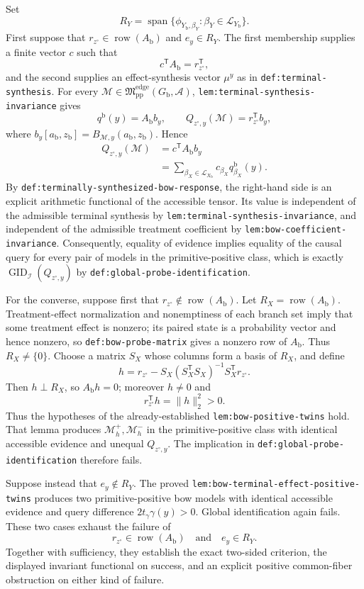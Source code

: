 Set
\[
 R_Y=\operatorname{span}\{\phi_{Y_{\mathrm b},\beta_Y}:\beta_Y\in\mathcal L_{Y_{\mathrm b}}\}.
\]
First suppose that \(r_{z^{\circ}}\in\operatorname{row}(A_{\mathrm b})\) and \(e_y\in R_Y\).  The first membership supplies a finite vector \(c\) such that
\[
 c^{\mathsf T}A_{\mathrm b}=r_{z^{\circ}}^{\mathsf T},
\]
and the second supplies an effect-synthesis vector \(\mu^y\) as in \texttt{def:terminal-synthesis}.  For every \(\mathcal M\in\mathfrak M_{\mathrm{pp}}^{\mathrm{edge}}(G_{\mathrm b},\mathcal A)\), \texttt{lem:terminal-synthesis-invariance} gives
\[
 q^{\mathrm b}(y)=A_{\mathrm b}b_y,
 \qquad
 Q_{z^{\circ},y}(\mathcal M)=r_{z^{\circ}}^{\mathsf T}b_y,
\]
where \(b_y[a_{\mathrm b},z_{\mathrm b}]=B_{\mathcal M,y}(a_{\mathrm b},z_{\mathrm b})\).  Hence
\[
\begin{aligned}
 Q_{z^{\circ},y}(\mathcal M)
 &=c^{\mathsf T}A_{\mathrm b}b_y\\
 &=\sum_{\beta_X\in\mathcal L_{X_{\mathrm b}}}
 c_{\beta_X}q^{\mathrm b}_{\beta_X}(y).
\end{aligned}
\]
By \texttt{def:terminally-synthesized-bow-response}, the right-hand side is an explicit arithmetic functional of the accessible tensor.  Its value is independent of the admissible terminal synthesis by \texttt{lem:terminal-synthesis-invariance}, and independent of the admissible treatment coefficient by \texttt{lem:bow-coefficient-invariance}.  Consequently, equality of evidence implies equality of the causal query for every pair of models in the primitive-positive class, which is exactly \(\operatorname{GID}_{\mathcal I}(Q_{z^{\circ},y})\) by \texttt{def:global-probe-identification}.

For the converse, suppose first that \(r_{z^{\circ}}\notin\operatorname{row}(A_{\mathrm b})\).  Let \(R_X=\operatorname{row}(A_{\mathrm b})\).  Treatment-effect normalization and nonemptiness of each branch set imply that some treatment effect is nonzero; its paired state is a probability vector and hence nonzero, so \texttt{def:bow-probe-matrix} gives a nonzero row of \(A_{\mathrm b}\).  Thus \(R_X\ne\{0\}\).  Choose a matrix \(S_X\) whose columns form a basis of \(R_X\), and define
\[
 h=r_{z^{\circ}}-S_X(S_X^{\mathsf T}S_X)^{-1}S_X^{\mathsf T}r_{z^{\circ}}.
\]
Then \(h\perp R_X\), so \(A_{\mathrm b}h=0\); moreover \(h\ne0\) and
\[
 r_{z^{\circ}}^{\mathsf T}h=\lVert h\rVert_2^2>0.
\]
Thus the hypotheses of the already-established \texttt{lem:bow-positive-twins} hold.  That lemma produces \(\mathcal M_h^+,\mathcal M_h^-\) in the primitive-positive class with identical accessible evidence and unequal \(Q_{z^{\circ},y}\).  The implication in \texttt{def:global-probe-identification} therefore fails.

Suppose instead that \(e_y\notin R_Y\).  The proved \texttt{lem:bow-terminal-effect-positive-twins} produces two primitive-positive bow models with identical accessible evidence and query difference \(2t_\gamma\gamma(y)>0\).  Global identification again fails.  These two cases exhaust the failure of
\[
 r_{z^{\circ}}\in\operatorname{row}(A_{\mathrm b})
 \quad\text{and}\quad e_y\in R_Y.
\]
Together with sufficiency, they establish the exact two-sided criterion, the displayed invariant functional on success, and an explicit positive common-fiber obstruction on either kind of failure.
